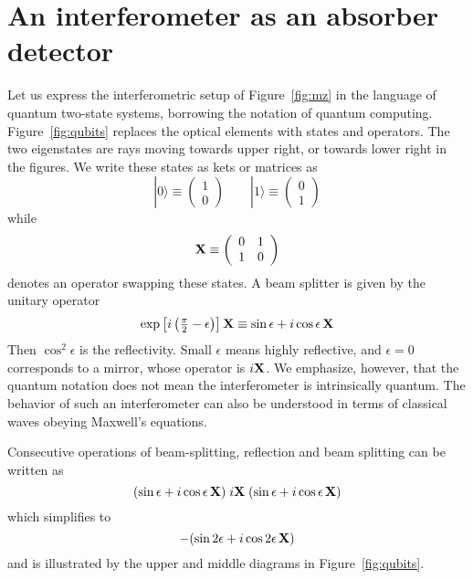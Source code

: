 \documentclass[12pt,aps,prb,preprint]{revtex4}
\def\ket#1{|#1\rangle}
\def\X{{\bf X}}
\begin{document}
\section{An interferometer as an absorber detector}\label{sec:interf}

Let us express the interferometric setup of Figure~\ref{fig:mz} in the
language of quantum two-state systems, borrowing the notation of
quantum computing.  Figure~\ref{fig:qubits} replaces the optical
elements with states and operators.  The two eigenstates are rays
moving towards upper right, or towards lower right in the figures. We
write these states as kets or matrices as
\begin{equation}
\ket0 \equiv \left( \begin{array}{c} 1 \\ 0 \end{array} \right)  \qquad
\ket1 \equiv \left( \begin{array}{c} 0 \\ 1 \end{array} \right)
\end{equation}
while
\begin{equation}
\X \equiv \left( \begin{array}{cc} 0 & 1 \\ 1 & 0 \end{array} \right)
\end{equation}
denotes an operator swapping these states.  A beam splitter is given
by the unitary operator
\begin{equation}
\exp\left[i\left({\textstyle\frac\pi2-\epsilon}\right)\right] \X \equiv
\sin\epsilon + i\cos\epsilon\,\X
\end{equation}
Then $\cos^2\epsilon$ is the reflectivity.  Small $\epsilon$ means
highly reflective, and $\epsilon=0$ corresponds to a mirror, whose
operator is $i\X$.  We emphasize, however, that the quantum notation
does not mean the interferometer is intrinsically quantum.  The
behavior of such an interferometer can also be understood in terms of
classical waves obeying Maxwell's equations.

Consecutive operations of beam-splitting, reflection and beam
splitting can be written as
\begin{equation}
     (\sin\epsilon + i\cos\epsilon\,\X)
     \; i\X \;
     (\sin\epsilon + i\cos\epsilon\,\X)
\end{equation}
which simplifies to
\begin{equation}
     -(\sin2\epsilon + i\cos2\epsilon\,\X)
\label{eqn:no-absorber}
\end{equation}
and is illustrated by the upper and middle diagrams in
Figure~\ref{fig:qubits}.
\end{document}
